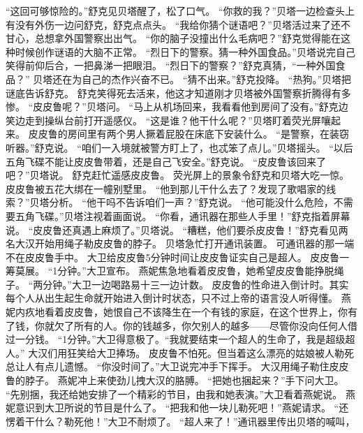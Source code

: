 \documentclass[a4paper,12pt,UTF8,twoside]{ctexbook}
\begin{document}
        “这回可够惊险的。”舒克见贝塔醒了，松了口气。 
        “你救的我？”贝塔一边检查头上有没有外伤一边问舒克，舒克点点头。 
        “我给你猜个谜语吧？”贝塔活过来了还不甘心，总想拿外国警察出出气。 
        “你的脑子没撞出什么毛病吧？”舒克觉得能在这种时候创作谜语的大脑不正常。 
        “烈日下的警察。猜一种外国食品。”贝塔说完自己笑得前仰后合，一把鼻涕一把眼泪。 
        “烈日下的警察？”舒克真猜，“一种外国食品？” 
        贝塔还在为自己的杰作兴奋不已。 
        “猜不出来。”舒克投降。 
        “热狗。”贝塔把谜底告诉舒克。 
        舒克笑得死去活来，他这才知道刚才贝塔被外国警察折腾得有多惨。 
        “皮皮鲁呢？”贝塔问。 
        “马上从机场回来，我看看他到房间了没有。”舒克边笑边走到操纵台前打开遥感仪。 
        “这是谁？他干什么呢？”贝塔盯着荧光屏嚷起来。 
        皮皮鲁的房间里有两个男人撅着屁股在床底下安装什么。 
        “是警察，在装窃听器。”舒克说。 
        “咱们一入境就被警方盯上了，也忒笨了点儿。”贝塔摇头。 
        “以后五角飞碟不能让皮皮鲁带着，还是自己飞安全。”舒克说。 
        “皮皮鲁该回来了吧？”贝塔说。 
        舒克赶忙遥感皮皮鲁。 
        荧光屏上的景象令舒克和贝塔大吃一惊。皮皮鲁被五花大绑在一幢别墅里。 
        “他到那儿干什么去了？发现了歌唱家的线索？”贝塔分析。 
        “他干吗不告诉咱们一声？”舒克说。 
        “他可能没什么危险，不需要五角飞碟。”贝塔注视着画面说。 
        “你看，通讯器在那些人手里！”舒克指着屏幕说。 
        “皮皮鲁还真遇上麻烦了。”贝塔说。 
        “糟糕，他们要杀皮皮鲁！”舒克看见两名大汉开始用绳子勒皮皮鲁的脖子。 
        贝塔急忙打开通讯装置。 
        可通讯器的那一端不在皮皮鲁手中。 
        大卫给皮皮鲁5分钟时间让皮皮鲁证实自己是超人。 
        皮皮鲁一筹莫展。 
        “1分钟。”大卫宣布。 
        燕妮焦急地看着皮皮鲁，她希望皮皮鲁能挣脱绳子。 
        “两分钟。”大卫一边喝路易十三一边计数。 
        皮皮鲁的性命进入倒计时。其实每个人从出生起生命就开始进入倒计时状态，只不过上帝的语言没人听得懂。 
        燕妮内疚地看着皮皮鲁，她恨自己不该降生在一个有钱的家庭，在这个世界上，你有了钱，你就欠了所有的人。你的钱越多，你欠别人的越多——尽管你没向任何人借过一分钱。 
        “1分钟。”大卫得意极了。“我就要结束一个超人的生命了，我是超级超人。” 
        大汉们用狂笑给大卫捧场。 
        皮皮鲁不怕死。但当着这么漂亮的姑娘被人勒死总让人有点儿遗憾。 
        “你没时间了。”大卫说完冲手下挥手。 
        大汉用绳子勒住皮皮鲁的脖子。 
        燕妮冲上来使劲儿拽大汉的胳膊。 
        “把她也捆起来？”手下问大卫。 
        “先别捆，我还给她安排了一个精彩的节目，由我和她表演。”大卫看着燕妮说。 
        燕妮意识到大卫所说的节目是什么了。 
        “把我和他一块儿勒死吧！”燕妮请求。 
        “还愣着干什么？勒死他！”大卫不耐烦了。 
        “超人来了！”通讯器里传出贝塔的喊叫， 
\end{document}
